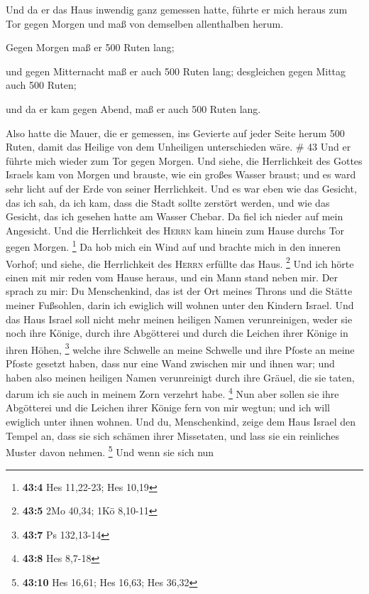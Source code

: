  Und da er das Haus inwendig ganz gemessen hatte, führte
er mich heraus zum Tor gegen Morgen und maß von demselben allenthalben
herum.

 Gegen Morgen maß er 500 Ruten lang;

 und gegen Mitternacht maß er auch 500 Ruten lang;
 desgleichen gegen Mittag auch 500 Ruten;

 und da er kam gegen Abend, maß er auch 500 Ruten lang.

 Also hatte die Mauer, die er gemessen, ins Gevierte auf
jeder Seite herum 500 Ruten, damit das Heilige von dem Unheiligen
unterschieden wäre. \# 43  Und er führte mich wieder zum
Tor gegen Morgen.  Und siehe, die Herrlichkeit des Gottes
Israels kam von Morgen und brauste, wie ein großes Wasser braust; und es
ward sehr licht auf der Erde von seiner Herrlichkeit.  Und
es war eben wie das Gesicht, das ich sah, da ich kam, dass die Stadt
sollte zerstört werden, und wie das Gesicht, das ich gesehen hatte am
Wasser Chebar. Da fiel ich nieder auf mein Angesicht.  Und
die Herrlichkeit des \textsc{Herrn} kam hinein zum Hause durchs Tor
gegen Morgen. \footnote{\textbf{43:4} Hes 11,22-23; Hes 10,19}
 Da hob mich ein Wind auf und brachte mich in den inneren
Vorhof; und siehe, die Herrlichkeit des \textsc{Herrn} erfüllte das
Haus. \footnote{\textbf{43:5} 2Mo 40,34; 1Kö 8,10-11}  Und
ich hörte einen mit mir reden vom Hause heraus, und ein Mann stand neben
mir.  Der sprach zu mir: Du Menschenkind, das ist der Ort
meines Throns und die Stätte meiner Fußsohlen, darin ich ewiglich will
wohnen unter den Kindern Israel. Und das Haus Israel soll nicht mehr
meinen heiligen Namen verunreinigen, weder sie noch ihre Könige, durch
ihre Abgötterei und durch die Leichen ihrer Könige in ihren Höhen,
\footnote{\textbf{43:7} Ps 132,13-14}  welche ihre
Schwelle an meine Schwelle und ihre Pfoste an meine Pfoste gesetzt
haben, dass nur eine Wand zwischen mir und ihnen war; und haben also
meinen heiligen Namen verunreinigt durch ihre Gräuel, die sie taten,
darum ich sie auch in meinem Zorn verzehrt habe. \footnote{\textbf{43:8}
  Hes 8,7-18}  Nun aber sollen sie ihre Abgötterei und die
Leichen ihrer Könige fern von mir wegtun; und ich will ewiglich unter
ihnen wohnen.  Und du, Menschenkind, zeige dem Haus
Israel den Tempel an, dass sie sich schämen ihrer Missetaten, und lass
sie ein reinliches Muster davon nehmen. \footnote{\textbf{43:10} Hes
  16,61; Hes 16,63; Hes 36,32}  Und wenn sie sich nun
